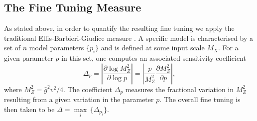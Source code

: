 \documentclass[preprint,amsmath,amssymb,aps,superscriptaddress,prd,showpacs,floatfix]{revtex4-1}
\begin{document}
\subsection{\label{subsec:tuningmeasure}The Fine Tuning Measure}
As stated above, in order to quantify the resulting fine tuning we apply the traditional Ellis-Barbieri-Giudice measure \cite{Ellis:1986yg,Barbieri:1987fn}. A specific model is characterised by a set of $n$ model parameters $\{p_i\}$ and is defined at some input scale $M_X$. For a given parameter $p$ in this set, one computes an associated sensitivity coefficient \cite{Feng:2013pwa}
\begin{equation}\label{eq:bgmeasure}
\Delta_p=\left | \frac{\partial \log M_Z^2}{\partial \log p}\right |=\left | \frac{p}{M_Z^2}\frac{\partial M_Z^2}{\partial p}\right |,
\end{equation}
where $M_Z^2=\bar{g}^2v^2/4$. The coefficient $\Delta_p$ measures the fractional variation in $M_Z^2$ resulting from a given variation in the parameter $p$. The overall fine tuning is then taken to be $\Delta = \underset{i}{\max}\,\{\Delta_{p_i}\}$.\\ \\
\end{document}
